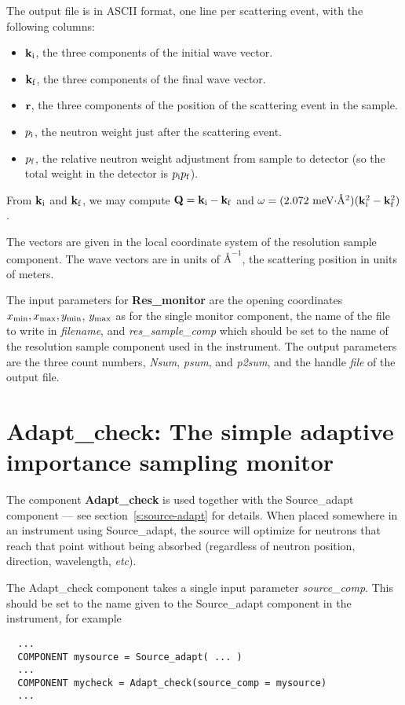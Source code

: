 The output file is in ASCII format, one line per scattering event, with
the following columns:
\begin{itemize}
\item ${\bf k}_{\rm i}$, the three components of the initial wave vector.
\item ${\bf k}_{\rm f}$, the three components of the final wave vector.
\item ${\bf r}$, the three components of the position of the scattering
  event in the sample.
\item $p_{\rm i}$, the neutron weight just after the scattering event.
\item $p_{\rm f}$, the relative neutron weight adjustment from sample to
  detector (so the total weight in the detector is $p_{\rm i}p_{\rm f}$).
\end{itemize}
From ${\bf k}_{\rm i}$ and ${\bf k}_{\rm f}$, we may compute ${\bf Q} =
{\bf k}_{\rm i} - {\bf k}_{\rm f}$ and $\omega = (\mbox{2.072
  meV$\cdot$\AA$^2$})({\bf k}_{\rm i}^2 - {\bf k}_{\rm f}^2)$.

The vectors are given in the local coordinate system of the resolution
sample component. The wave vectors are in units of $\mbox{\AA}^{-1}$, the
scattering position in units of meters.

The input parameters for {\bf Res\_monitor} are the opening coordinates
$x_{\rm min}, x_{\rm max}, y_{\rm min}$, $y_{\rm max}$ as for the single
monitor component, the name of the file to write in \textit{filename},
and \textit{res\_sample\_comp} which should be set to the name of the
resolution sample component used in the instrument.  The output
parameters are the three count numbers, \textit{Nsum}, \textit{psum},
and \textit{p2sum}, and the handle \textit{file} of the output file.

\section{Adapt\_check: The simple adaptive importance sampling monitor}
\label{s:adapt_check}

The component {\bf Adapt\_check} is used together with the Source\_adapt
component --- see section~\ref{s:source-adapt} for details. When placed
somewhere in an instrument using Source\_adapt, the source will optimize
for neutrons that reach that point without being absorbed (regardless of
neutron position, direction, wavelength, \textit{etc}).

The Adapt\_check component takes a single input parameter
\textit{source\_comp}. This should be set to the name given to the
Source\_adapt component in the instrument, for example
\begin{verbatim}
  ...
  COMPONENT mysource = Source_adapt( ... )
  ...
  COMPONENT mycheck = Adapt_check(source_comp = mysource)
  ...
\end{verbatim}


